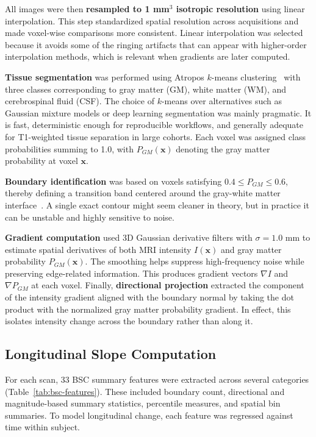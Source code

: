 \documentclass[blue]{ludusofficial}  %
\begin{document}
All images were then \textbf{resampled to 1 mm$^3$ isotropic resolution} using linear interpolation. This step standardized spatial resolution across acquisitions and made voxel-wise comparisons more consistent. Linear interpolation was selected because it avoids some of the ringing artifacts that can appear with higher-order interpolation methods, which is relevant when gradients are later computed.

\textbf{Tissue segmentation} was performed using Atropos $k$-means clustering~\cite{avants2011atropos} with three classes corresponding to gray matter (GM), white matter (WM), and cerebrospinal fluid (CSF). The choice of $k$-means over alternatives such as Gaussian mixture models or deep learning segmentation was mainly pragmatic. It is fast, deterministic enough for reproducible workflows, and generally adequate for T1-weighted tissue separation in large cohorts. Each voxel was assigned class probabilities summing to 1.0, with $P_{GM}(\mathbf{x})$ denoting the gray matter probability at voxel $\mathbf{x}$.

\textbf{Boundary identification} was based on voxels satisfying $0.4 \leq P_{GM} \leq 0.6$, thereby defining a transition band centered around the gray-white matter interface~\cite{olafson2021bsc}. A single exact contour might seem cleaner in theory, but in practice it can be unstable and highly sensitive to noise.

\textbf{Gradient computation} used 3D Gaussian derivative filters with $\sigma = 1.0$ mm to estimate spatial derivatives of both MRI intensity $I(\mathbf{x})$ and gray matter probability $P_{GM}(\mathbf{x})$. The smoothing helps suppress high-frequency noise while preserving edge-related information. This produces gradient vectors $\nabla I$ and $\nabla P_{GM}$ at each voxel. Finally, \textbf{directional projection} extracted the component of the intensity gradient aligned with the boundary normal by taking the dot product with the normalized gray matter probability gradient. In effect, this isolates intensity change across the boundary rather than along it.

\subsection{Longitudinal Slope Computation}

For each scan, 33 BSC summary features were extracted across several categories (Table~\ref{tab:bsc-features}). These included boundary count, directional and magnitude-based summary statistics, percentile measures, and spatial bin summaries. To model longitudinal change, each feature was regressed against time within subject.
\end{document}
